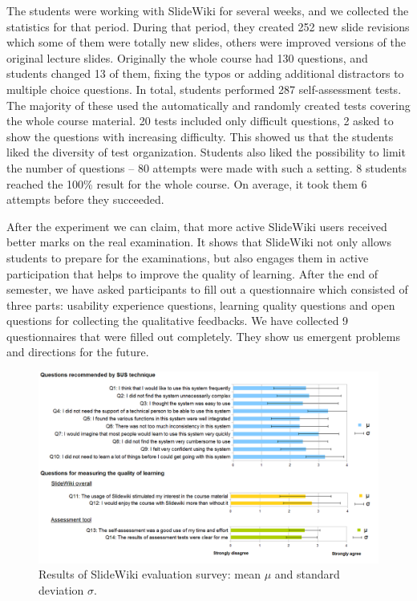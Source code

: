 \documentclass[ngerman,UKenglish,table]{scrbook}
\begin{document}
The students were working with SlideWiki for several weeks, and we collected the statistics for that period.
During that period, they created 252 new slide revisions which some of them were totally new slides, others were improved versions of the original lecture slides.
Originally the whole course had 130 questions, and students changed 13 of them, fixing the typos or adding additional distractors to multiple choice questions.
In total, students performed 287 self-assessment tests.
The majority of these used the automatically and randomly created tests covering the whole course material.
20 tests included only difficult questions, 2 asked to show the questions with increasing difficulty.
This showed us that the students liked the diversity of test organization.
Students also liked the possibility to limit the number of questions -- 80 attempts were made with such a setting.
8 students reached the 100\% result for the whole course.
On average, it took them 6 attempts before they succeeded.

After the experiment we can claim, that more active SlideWiki users received better marks on the real examination.
It shows that SlideWiki not only allows students to prepare for the examinations, but also engages them in active participation that helps to improve the quality of learning.
After the end of semester, we have asked participants to fill out a questionnaire which consisted of three parts: usability experience questions, learning quality questions and open questions for collecting the qualitative feedbacks.
We have collected 9 questionnaires that were filled out completely.
They show us emergent problems and directions for the future.

\begin{figure}[t!]
	\centering
		\includegraphics[width=\textwidth]{images/survey.png}
	\caption{Results of SlideWiki evaluation survey: mean $\mu$ and standard deviation $\sigma$.}
	\label{fig:survey}
\end{figure}
\end{document}
